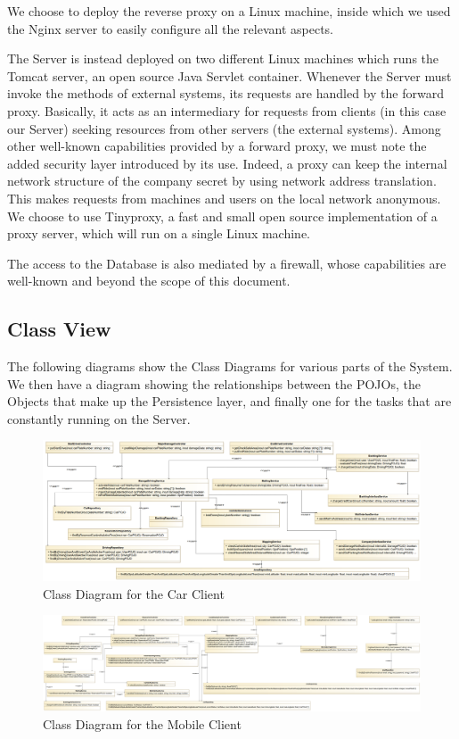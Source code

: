 \documentclass[12pt]{article}
\begin{document}
We choose to deploy the reverse proxy on a Linux machine, inside which we used the Nginx server to easily configure all the relevant aspects.

\bigskip
The Server is instead deployed on two different Linux machines which runs the Tomcat server, an open source Java Servlet container.
Whenever the Server must invoke the methods of external systems, its requests are handled by the forward proxy. Basically, it acts as an intermediary for requests from clients (in this case our Server) seeking resources from other servers (the external systems). Among other well-known capabilities provided by a forward proxy, we must note the added security layer introduced by its use. Indeed, a proxy can keep the internal network structure of the company secret by using network address translation. This makes requests from machines and users on the local network anonymous. 
We choose to use Tinyproxy, a fast and small open source implementation of a proxy server, which will run on a single Linux machine.

\bigskip
The access to the Database is also mediated by a firewall, whose capabilities are well-known and beyond the scope of this document.

\clearpage

\subsection{Class View}
The following diagrams show the Class Diagrams for various parts of the System.
We then have a diagram showing the relationships between the POJOs, the Objects that make up the Persistence layer, and finally one for the tasks that are constantly running on the Server.

\begin{figure}[h]
	\centering
	\includegraphics[width=\textwidth]{../Images/CarClient_Class}
	\caption{Class Diagram for the Car Client}
\end{figure}

\begin{figure}[h]
	\centering
	\includegraphics[width=\textwidth]{../Images/MobileClient_Class}
	\caption{Class Diagram for the Mobile Client}
\end{figure}
\end{document}
